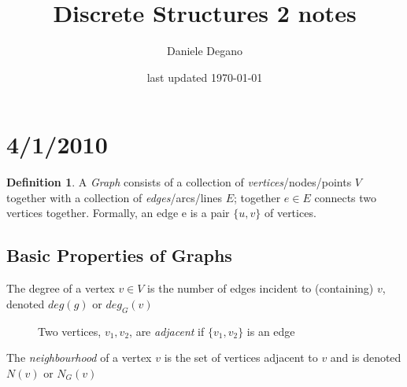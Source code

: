 \documentclass{article}
\author{Daniele Degano}
\title{Discrete Structures 2 notes}
\date{last updated \today}
\begin{document}
\maketitle

\graphicspath{{xfig-xports/}}

\theoremstyle{definition}
\newtheorem*{defn}{Definition}

\theoremstyle{definition}
\newtheorem*{examp}{Example}

\theoremstyle{plain}
\newtheorem{thm}{Theorem}

\theoremstyle{plain}
\newtheorem{prop}{Proposition}

\theoremstyle{plain}
\newtheorem{cor}{Corollary}

\theoremstyle{plain}
\newtheorem{lem}{Lemma}

\theoremstyle{remark}
\newtheorem*{rem}{Remark}

\theoremstyle{remark}
\newtheorem*{clm}{Claim}

\theoremstyle{remark}
\newtheorem*{cav}{Caveat}

\theoremstyle{remark}
\newtheorem*{rec}{Recall}

\theoremstyle{remark}
\newtheorem*{exer}{Exercise}
\section*{4/1/2010}

\begin{defn}
A \emph{Graph} consists of a collection of \emph{vertices}/nodes/points $V$ together with a collection of \emph{edges}/arcs/lines $E$; together $e \in E$ connects two vertices together.  Formally, an edge e is a pair $\{u,v\}$ of vertices.
\end{defn}

\subsection*{Basic Properties of Graphs}

The degree of a vertex $v \in V$ is the number of edges incident to (containing) $v$, denoted $deg(g)$ or $deg_G(v)$

\begin{figure}[H]
\centering
 
\caption{Two vertices, $v_1,v_2$, are \emph{adjacent} if  $\{v_1,v_2\}$ is an edge}
\end{figure}

The \emph{neighbourhood} of a vertex $v$ is the set of vertices adjacent to $v$ and is denoted $N(v)$ or $N_G(v)$
\end{document}

